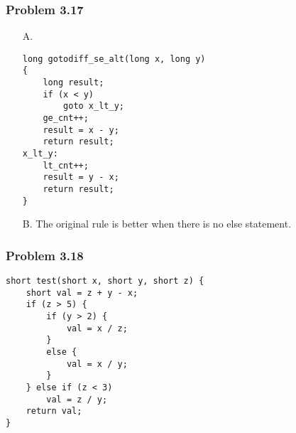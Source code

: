 \documentclass[a4paper]{article}
\begin{document}
\subsubsection*{Problem 3.17}
\begin{enumerate}
    \item[A.]
\begin{lstlisting}
long gotodiff_se_alt(long x, long y) 
{ 
    long result; 
    if (x < y) 
        goto x_lt_y; 
    ge_cnt++;
    result = x - y;
    return result;
x_lt_y:
    lt_cnt++;
    result = y - x;
    return result;
}
\end{lstlisting} 
    \item[B.] The original rule is better when there is no else statement.
\end{enumerate}

\subsubsection*{Problem 3.18}
\begin{lstlisting}
short test(short x, short y, short z) {
    short val = z + y - x;
    if (z > 5) {
        if (y > 2) {
            val = x / z;
        }
        else {
            val = x / y;
        }
    } else if (z < 3) 
        val = z / y;
    return val;
}
\end{lstlisting}
\end{document}
